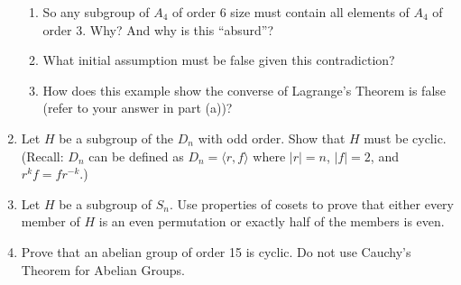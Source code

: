 \documentclass{article}
\begin{document}
\begin{enumerate}
\begin{enumerate}
\item So any subgroup of $A_4$ of order 6 size must contain all elements of $A_4$ of order 3. Why? And why is this ``absurd''?

\item What initial assumption must be false given this contradiction?

\item How does this example show the converse of Lagrange's Theorem is false (refer to your answer in part (a))?

\end{enumerate}


\item Let $H$ be a subgroup of the $D_n$ with odd order. Show that $H$ must be cyclic. (Recall: $D_n$ can be defined as $D_n=\langle r,f\rangle$ where $|r|=n$, $|f|=2$, and $r^kf=fr^{-k}$.)

\item Let $H$ be a subgroup of $S_n$. Use properties of cosets to prove that either every member of $H$ is an even permutation or exactly half of the members is even. 

\item Prove that an abelian group of order 15 is cyclic. Do not use Cauchy's Theorem for Abelian Groups. 

\end{enumerate}
\end{document}
